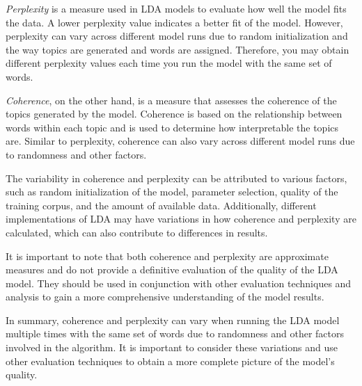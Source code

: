 \documentclass[10pt]{article} %
\begin{document}
	\textit{Perplexity} is a measure used in LDA models to evaluate how well the model fits the data. A lower perplexity value indicates a better fit of the model. However, perplexity can vary across different model runs due to random initialization and the way topics are generated and words are assigned. Therefore, you may obtain different perplexity values each time you run the model with the same set of words.
	
	\textit{Coherence}, on the other hand, is a measure that assesses the coherence of the topics generated by the model. Coherence is based on the relationship between words within each topic and is used to determine how interpretable the topics are. Similar to perplexity, coherence can also vary across different model runs due to randomness and other factors.
	
	The variability in coherence and perplexity can be attributed to various factors, such as random initialization of the model, parameter selection, quality of the training corpus, and the amount of available data. Additionally, different implementations of LDA may have variations in how coherence and perplexity are calculated, which can also contribute to differences in results.
	
	It is important to note that both coherence and perplexity are approximate measures and do not provide a definitive evaluation of the quality of the LDA model. They should be used in conjunction with other evaluation techniques and analysis to gain a more comprehensive understanding of the model results.
	
	In summary, coherence and perplexity can vary when running the LDA model multiple times with the same set of words due to randomness and other factors involved in the algorithm. It is important to consider these variations and use other evaluation techniques to obtain a more complete picture of the model's quality.
	

	
\end{document}

